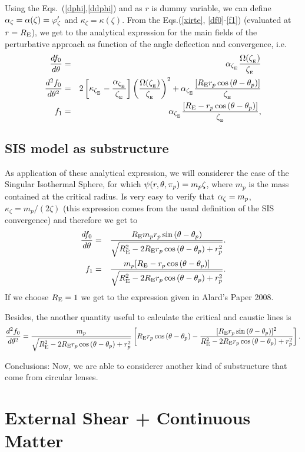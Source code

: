 Using the Eqs.~(\ref{dphi},\ref{ddphi}) and as $r$ is dummy variable, we can define $\alpha_\zeta=\alpha(\zeta)=\varphi^\prime_\zeta$ and $\kappa_\zeta=\kappa(\zeta)$. From the
Eqs.(\ref{xirte}, \ref{df0}-\ref{f1}) (evaluated at $r=R_{\mathrm{E}}$), we get to the analytical expression for the main fields of
the perturbative approach as function of the angle deflection and convergence, i.e.
\begin{eqnarray}
\dfrac{df_0}{d\te}&=&\al_{\xie}\dfrac{\Omega(\xie)}{\xie}\\
\dfrac{d^2f_0}{d\te^2}&=&2\left[\kappa_{\xie}-\dfrac{\al_{\xie}}{\xie}\right]%
\left(\dfrac{\Omega(\xie)}{\xie}\right)^2+\al_{\xie}\dfrac{[\re r_p\cos{(\te-\tep)}]}{\xie}\\
f_1&=&\al_{\xie}\dfrac{[\re-r_p\cos{(\te-\tep)}]}{\xie},
\end{eqnarray}

\subsection{SIS model as substructure}

As application of these analytical expression, we will considerer the case of the Singular Isothermal Sphere, for
which $\psi(r,\theta,\pi_p)=m_p\zeta$, where $m_p$ is the mass contained at the critical radius.
Is very easy to verify that $\alpha_\zeta=m_p$,  $\kappa_\zeta=m_p/(2\zeta)$ (this expression comes from the usual
definition of the SIS convergence) and therefore we get to
\begin{eqnarray}
\dfrac{d f_0}{d\theta}&=&\dfrac{R_{\mathrm{E}} m_p r_p \sin{(\theta-\theta_p)}}{\sqrt{R_{\mathrm{E}}^2-2R_{\mathrm{E}} r_p\cos{(\theta-\theta_p)}+r^2_p}}.\\
f_1&=&\dfrac{m_p[R_{\mathrm{E}}-r_p\cos{(\theta-\theta_p)}]}{\sqrt{R_{\mathrm{E}}^2-2R_{\mathrm{E}} r_p\cos{(\theta-\theta_p)}+r^2_p}}.
\end{eqnarray}
If we choose $R_{\mathrm{E}}=1$ we get to the expression given in Alard's Paper 2008.

Besides, the another quantity useful to calculate the critical and caustic lines is
\begin{equation}
\dfrac{d^2 f_0}{d\te^2}=\dfrac{m_p}{\sqrt{\re^2-2\re r_p\cos{(\te-\tep)}+r^2_p}}%
\left[\re r_p\cos{(\te-\tep)}- \dfrac{[\re r_p\sin{(\te-\tep)}]^2}{\re^2-2\re r_p\cos{(\te-\tep)}+r^2_p} \right].
\end{equation}

Conclusions: Now, we are able to considerer another kind of substructure that come from circular lenses.


\section{External Shear + Continuous Matter}

